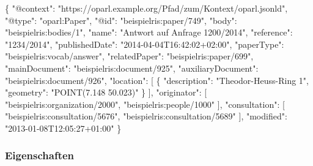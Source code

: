 \documentclass[,a4paper]{article}
\newenvironment{Shaded}{}{}
\newcommand{\DataTypeTok}[1]{\textcolor[rgb]{0.56,0.13,0.00}{{#1}}}
\newcommand{\StringTok}[1]{\textcolor[rgb]{0.25,0.44,0.63}{{#1}}}
\newcommand{\OtherTok}[1]{\textcolor[rgb]{0.00,0.44,0.13}{{#1}}}
\newcommand{\FunctionTok}[1]{\textcolor[rgb]{0.02,0.16,0.49}{{#1}}}
\begin{document}
\begin{Shaded}
\begin{Highlighting}[]
\FunctionTok{\{}
    \DataTypeTok{"@context"}\FunctionTok{:} \StringTok{"https://oparl.example.org/Pfad/zum/Kontext/oparl.jsonld"}\FunctionTok{,}
    \DataTypeTok{"@type"}\FunctionTok{:} \StringTok{"oparl:Paper"}\FunctionTok{,}
    \DataTypeTok{"@id"}\FunctionTok{:} \StringTok{"beispielris:paper/749"}\FunctionTok{,}
    \DataTypeTok{"body"}\FunctionTok{:} \StringTok{"beispielris:bodies/1"}\FunctionTok{,}
    \DataTypeTok{"name"}\FunctionTok{:} \StringTok{"Antwort auf Anfrage 1200/2014"}\FunctionTok{,}
    \DataTypeTok{"reference"}\FunctionTok{:} \StringTok{"1234/2014"}\FunctionTok{,}
    \DataTypeTok{"publishedDate"}\FunctionTok{:} \StringTok{"2014-04-04T16:42:02+02:00"}\FunctionTok{,}
    \DataTypeTok{"paperType"}\FunctionTok{:} \StringTok{"beispielris:vocab/answer"}\FunctionTok{,}
    \DataTypeTok{"relatedPaper"}\FunctionTok{:} \StringTok{"beispielris:paper/699"}\FunctionTok{,}
    \DataTypeTok{"mainDocument"}\FunctionTok{:} \StringTok{"beispielris:document/925"}\FunctionTok{,}
    \DataTypeTok{"auxiliaryDocument"}\FunctionTok{:} \StringTok{"beispielris:document/926"}\FunctionTok{,}
    \DataTypeTok{"location"}\FunctionTok{:} \OtherTok{[}
        \FunctionTok{\{}
            \DataTypeTok{"description"}\FunctionTok{:} \StringTok{"Theodor-Heuss-Ring 1"}\FunctionTok{,}
            \DataTypeTok{"geometry"}\FunctionTok{:} \StringTok{"POINT(7.148  50.023)"}
        \FunctionTok{\}}
    \OtherTok{]}\FunctionTok{,}
    \DataTypeTok{"originator"}\FunctionTok{:} \OtherTok{[}
        \StringTok{"beispielris:organization/2000"}\OtherTok{,}
        \StringTok{"beispielris:people/1000"}
    \OtherTok{]}\FunctionTok{,}
    \DataTypeTok{"consultation"}\FunctionTok{:} \OtherTok{[}
        \StringTok{"beispielris:consultation/5676"}\OtherTok{,}
        \StringTok{"beispielris:consultation/5689"}
    \OtherTok{]}\FunctionTok{,}
    \DataTypeTok{"modified"}\FunctionTok{:} \StringTok{"2013-01-08T12:05:27+01:00"}
\FunctionTok{\}}
\end{Highlighting}
\end{Shaded}

\subsubsection{Eigenschaften}\label{eigenschaften-6}
\end{document}
